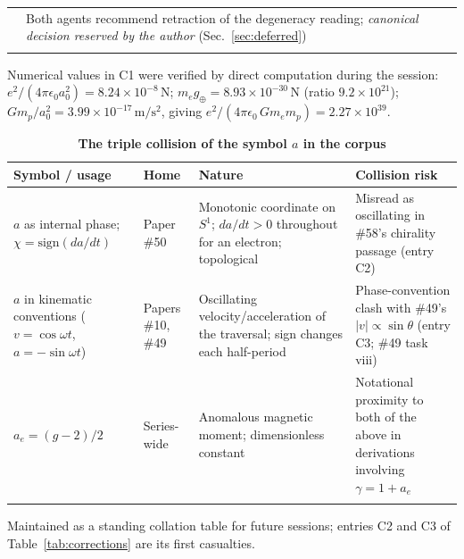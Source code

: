 \documentclass[%
 reprint, amsmath,amssymb, aps, prb, ]{revtex4-2}
\numberwithin{equation}{section}
\newcommand{\iphase}{\theta}  %
\begin{document}
\begin{table}[t!]
\begin{tabular}{p{1.4cm}p{2.4cm}p{7.2cm}p{4.0cm}}
& Both agents recommend retraction of the degeneracy reading; \emph{canonical decision reserved by the author} (Sec.~\ref{sec:deferred}) \\
\addlinespace[0.2cm]
\bottomrule
\end{tabular}
\vspace{0.2cm}
\begin{minipage}{0.95\textwidth}
\justifying\footnotesize
Numerical values in C1 were verified by direct computation during the session: $e^2/(4\pi\epsilon_0 a_0^2)=8.24\times10^{-8}\,\mathrm{N}$; $m_e g_{\oplus}=8.93\times10^{-30}\,\mathrm{N}$ (ratio $9.2\times10^{21}$); $Gm_p/a_0^2=3.99\times10^{-17}\,\mathrm{m/s^2}$, giving $e^2/(4\pi\epsilon_0\,G m_e m_p)=2.27\times10^{39}$.
\end{minipage}
\end{table}

\begin{table}[t!]
\centering
\caption{\textbf{The triple collision of the symbol \boldmath$a$ in the corpus}}
\label{tab:acollision}
\renewcommand{\arraystretch}{1.4}
\begin{tabular}{p{3.2cm}p{3.4cm}p{4.4cm}p{4.0cm}}
\toprule
\textbf{Symbol / usage} & \textbf{Home} & \textbf{Nature} & \textbf{Collision risk} \\
\midrule
$a$ as internal phase; $\chi=\mathrm{sign}(da/dt)$
& Paper \#50
& Monotonic coordinate on $S^1$; $da/dt>0$ throughout for an electron; topological
& Misread as oscillating in \#58's chirality passage (entry C2) \\
\addlinespace[0.3cm]
$a$ in kinematic conventions ($v=\cos\omega t$, $a=-\sin\omega t$)
& Papers \#10, \#49
& Oscillating velocity/acceleration of the traversal; sign changes each half-period
& Phase-convention clash with \#49's $|v|\propto\sin\iphase$ (entry C3; \#49 task viii) \\
\addlinespace[0.3cm]
$a_e=(g-2)/2$
& Series-wide
& Anomalous magnetic moment; dimensionless constant
& Notational proximity to both of the above in derivations involving $\gamma=1+a_e$ \\
\addlinespace[0.2cm]
\bottomrule
\end{tabular}
\vspace{0.2cm}
\begin{minipage}{0.95\textwidth}
\justifying\footnotesize
Maintained as a standing collation table for future sessions; entries C2 and C3 of Table~\ref{tab:corrections} are its first casualties.
\end{minipage}
\end{table}
\end{document}
